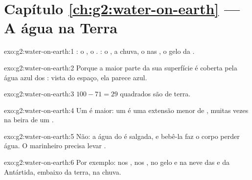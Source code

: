 \section*{Capítulo \ref{ch:g2:water-on-earth} --- A água na Terra}

\begin{solution}{exo:g2:water-on-earth:1}
: o , o . : o , a chuva, o  nas
, o gelo da .
\end{solution}

\begin{solution}{exo:g2:water-on-earth:2}
Porque a maior parte da sua superfície é coberta pela água azul dos
: vista do espaço, ela parece azul.
\end{solution}

\begin{solution}{exo:g2:water-on-earth:3}
$100 - 71 = 29$ quadrados são de terra.
\end{solution}

\begin{solution}{exo:g2:water-on-earth:4}
Um  é maior: um  é uma extensão menor de , muitas
vezes na beira de um .
\end{solution}

\begin{solution}{exo:g2:water-on-earth:5}
Não: a água do  é salgada, e bebê-la faz o corpo perder água. O
marinheiro precisa levar .
\end{solution}

\begin{solution}{exo:g2:water-on-earth:6}
Por exemplo: nos , nos , no gelo e na neve das  e da
Antártida, embaixo da terra, na chuva.
\end{solution}

